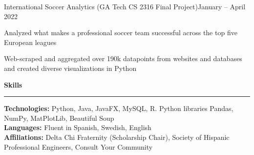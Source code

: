 \documentclass{article}
\newcommand{\horizontal}{\vspace{3pt}\hrule}
\newcommand{\sectitle}[1]{\vspace{3pt} \textbf{\large #1} \horizontal}
\newcommand{\skill}[2]{\textbf{#1:} #2}
\begin{document}
\begin{flushleft}
    \begin{subexperience}{International Soccer Analytics (GA Tech CS 2316 Final Project)}{January -- April 2022}
        \item Analyzed what makes a professional soccer team successful across the top five European leagues
        \item Web-scraped and aggregated over 190k datapoints from websites and databases and created diverse visualizations in Python
    \end{subexperience}

\sectitle{Skills}

    \vspace{3pt}
    \skill{Technologies}{Python, Java, JavaFX, MySQL, R. Python libraries Pandas, NumPy, MatPlotLib, Beautiful Soup} \\
    \skill{Languages}{Fluent in Spanish, Swedish, English} \\
    \skill{Affiliations}{Delta Chi Fraternity (Scholarship Chair), Society of Hispanic Professional Engineers, Consult Your Community}

\end{flushleft}
\end{document}
